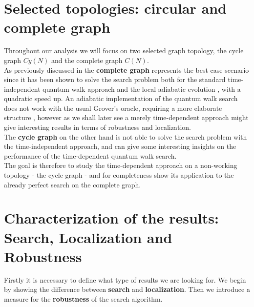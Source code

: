 \clearpage
\section{Selected topologies: circular and complete graph}
    Throughout our analysis we will focus on two selected graph topology, the cycle graph $Cy(N)$ and the complete graph $C(N)$. \\

    As previously discussed in  the \textbf{complete graph} represents the best case scenario since it has been shown to solve the search problem both for the standard time-independent quantum walk approach \cite{Childs2004} and the local adiabatic evolution \cite{Roland2002}, with a quadratic speed up. An adiabatic implementation of the quantum walk search does not work with the usual Grover's oracle, requiring a more elaborate structure \cite{Wong2016}, however as we shall later see a merely time-dependent approach might give interesting results in terms of robustness and localization.  \\

    The \textbf{cycle graph} on the other hand is not able to solve the search problem with the time-independent approach, and can give some interesting insights on the performance of the time-dependent quantum walk search.  \\
    The goal is therefore to study the time-dependent approach on a non-working topology - the cycle graph - and for completeness show its application to the already perfect search on the complete graph.

\section{Characterization of the results: Search, Localization and Robustness}
    Firstly it is necessary to define what type of results we are looking for. We begin by showing the difference between \textbf{search} and \textbf{localization}. Then we introduce a measure for the \textbf{robustness} of the search algorithm.

